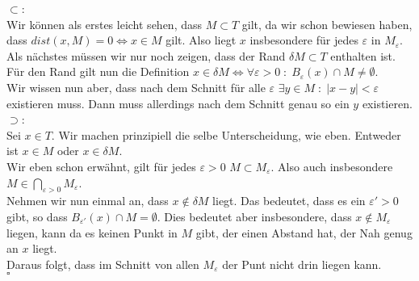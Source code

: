\documentclass[11pt,a4paper,ngerman]{article}
\begin{document}
\begin{enumerate}[(i)]
                $\subset$:\\
                Wir können als erstes leicht sehen, dass $M \subset T$ gilt, da wir schon
                bewiesen haben, dass $dist(x,M) = 0 \Leftrightarrow  x \in M$ gilt.
                Also liegt $x$ insbesondere für jedes $\varepsilon$ in $M_\varepsilon$.\\

                Als nächstes müssen wir nur noch zeigen, dass der Rand $\delta M \subset T$
                enthalten ist.\\
                Für den Rand gilt nun die Definition $x \in \delta M \Leftrightarrow \forall \varepsilon
                > 0 \; : \; B_\varepsilon (x) \cap M \not = \emptyset$.\\
                Wir wissen nun aber, dass nach dem Schnitt für alle $\varepsilon$ $\exists y \in M \; : \;
                | x - y | < \varepsilon$ existieren muss. Dann muss allerdings nach dem Schnitt
                genau so ein $y$ existieren.\\

                $\supset$:\\
                Sei $x \in T$.
                Wir machen prinzipiell die selbe Unterscheidung, wie eben. Entweder ist
                $x \in M$ oder $x \in \delta M$.\\
            
                Wir eben schon erwähnt, gilt für jedes $\varepsilon > 0$ $M \subset M_\varepsilon$.
                Also auch insbesondere $M \in \underset{\varepsilon > 0}{\bigcap} M_\varepsilon$.\\

                Nehmen wir nun einmal an, dass $x \not \in \delta M$ liegt. Das bedeutet, dass es ein
                $\varepsilon ' > 0$ gibt, so dass $B_{\varepsilon '}(x) \cap M = \emptyset$. Dies
                bedeutet aber insbesondere, dass $x \not\in M_\varepsilon$ liegen, kann da es keinen
                Punkt in $M$ gibt, der einen Abstand hat, der Nah genug an $x$ liegt.\\
                Daraus folgt, dass im Schnitt von allen $M_\varepsilon$ der Punt nicht drin liegen kann.\\

                \mbox{} \hfill $\square$
	\end{enumerate}
\end{document}
